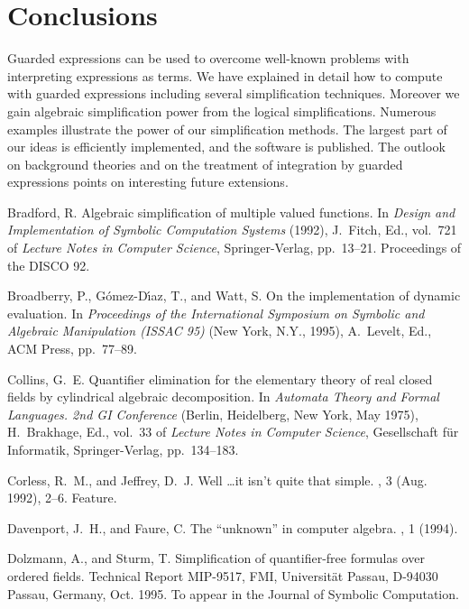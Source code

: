 \section{Conclusions}
Guarded expressions can be used to overcome well-known problems with
interpreting expressions as terms. We have explained in detail how to
compute with guarded expressions including several simplification
techniques. Moreover we gain algebraic simplification power from the
logical simplifications. Numerous examples illustrate the power of our
simplification methods. The largest part of our ideas is efficiently
implemented, and the software is published. The outlook on background
theories and on the treatment of integration by guarded expressions
points on interesting future extensions.
\nocite{Bradford:92}

\begin{thebibliography}{10}

{Bradford, R.}
\newblock Algebraic simplification of multiple valued functions.
\newblock In {\em Design and Implementation of Symbolic Computation Systems\/}
  (1992), J.~Fitch, Ed., vol.~721 of {\em Lecture Notes in Computer Science},
  Springer-Verlag, pp.~13--21.
\newblock Proceedings of the DISCO 92.

{Broadberry, P., G\'omez-D\'{\i}az, T., and Watt, S.}
\newblock On the implementation of dynamic evaluation.
\newblock In {\em Proceedings of the International Symposium on Symbolic and
  Algebraic Manipulation (ISSAC 95)\/} (New York, N.Y., 1995), A.~Levelt, Ed.,
  ACM Press, pp.~77--89.

{Collins, G.~E.}
\newblock Quantifier elimination for the elementary theory of real closed
  fields by cylindrical algebraic decomposition.
\newblock In {\em Automata Theory and Formal Languages. 2nd GI Conference\/}
  (Berlin, Heidelberg, New York, May 1975), H.~Brakhage, Ed., vol.~33 of {\em
  Lecture Notes in Computer Science}, Gesellschaft f\"ur Informatik,
  Springer-Verlag, pp.~134--183.

{Corless, R.~M., and Jeffrey, D.~J.}
\newblock Well \dots it isn't quite that simple.
, 3 (Aug. 1992), 2--6.
\newblock Feature.

{Davenport, J.~H., and Faure, C.}
\newblock The ``unknown'' in computer algebra.
, 1 (1994).

{Dolzmann, A., and Sturm, T.}
\newblock Simplification of quan\-ti\-fier-free formulas over ordered fields.
\newblock Technical Report MIP-9517, FMI, Universit\"at Passau, D-94030 Passau,
  Germany, Oct. 1995.
\newblock To appear in the Journal of Symbolic Computation.


\end{thebibliography}
